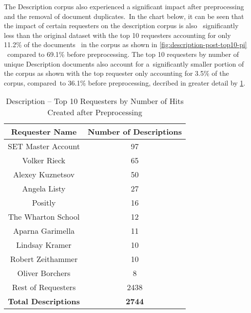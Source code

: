 \documentclass[letterpaper,12pt]{article}
\begin{document}
\newpage

The Description corpus also experienced a significant impact after preprocessing and the removal of document duplicates.\ 
In the chart below, it can be seen that the impact of certain requesters on the description corpus is also \
significantly less than the original dataset with the top 10 requesters accounting for only 11.2\% of the documents \
in the corpus as shown in \ref{fig:description-post-top10-pi} \
compared to 69.1\% before preprocessing. The top 10 requesters by number of unique Description documents also account for a\
significantly smaller portion of the corpus as shown with the top requester only accounting for 3.5\% of the corpus, compared\
to 36.1\% before preprocessing, decribed in greater detail by \ref{tab:description_requester_top_10}.

\begin{table}
	\caption{\label{tab:description_requester_top_10} Description -- Top 10 Requesters by Number of Hits Created after Preprocessing}
	\begin{center}
		\begin{tabular}{| c | c |}
				\hline
				\textbf{Requester Name} &  \textbf{Number of Descriptions} \\
				\hline
				SET Master Account &              97 \\
				\hline
				Volker Rieck       &              65 \\
				\hline
				Alexey Kuznetsov   &              50 \\
				\hline
				Angela Listy       &              27 \\
				\hline
				Positly            &              16 \\
				\hline
				The Wharton School &              12 \\
				\hline
				Aparna Garimella   &              11 \\
				\hline
				Lindsay Kramer     &              10 \\
				\hline
				Robert Zeithammer  &              10 \\
				\hline
				Oliver Borchers    &               8 \\
				\hline
				Rest of Requesters &            2438 \\
				\hline
				\textbf{Total Descriptions} &  \textbf{2744} \\
				\hline
		\end{tabular}
	\end{center}
\end{table}
\end{document}
